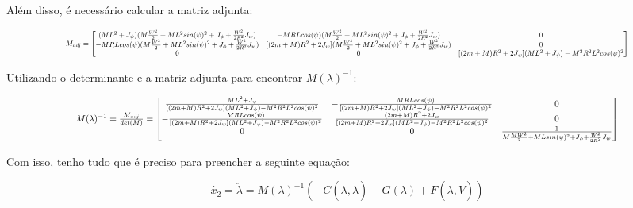 \documentclass[10pt]{article}
\begin{document}
\quad Além disso, é necessário calcular a matriz adjunta:

\begin{equation}
    \scalebox{0.65}{$
    M_{adj} =
    \begin{bmatrix}
        (ML^2 + J_\psi)(M\frac{W^2}{2}+ML^2sin(\psi)^2+J_{\phi}+\frac{W^2}{2R^2}J_w) & -MRLcos(\psi)(M\frac{W^2}{2}+ML^2sin(\psi)^2+J_{\phi}+\frac{W^2}{2R^2}J_w) & 0 \\
        -MRLcos(\psi)(M\frac{W^2}{2}+ML^2sin(\psi)^2+J_{\phi}+\frac{W^2}{2R^2}J_w) & [(2m + M)R^2 + 2J_w](M\frac{W^2}{2}+ML^2sin(\psi)^2+J_{\phi}+\frac{W^2}{2R^2}J_w) & 0 \\
        0 & 0 & [(2m + M)R^2 + 2J_w](ML^2 + J_\psi) - M^2R^2L^2cos(\psi)^2
    \end{bmatrix}
    $}
\end{equation}

\quad Utilizando o determinante e a matriz adjunta para encontrar $M(\lambda)^{-1}$:

\begin{equation}
    \scalebox{0.8}{$
    M(\lambda)^{-1} = \frac{M_{adj}}{det(M)} =
    \begin{bmatrix}
        \frac{ML^2 + J_\psi}{[(2m + M)R^2 + 2J_w](ML^2 + J_\psi) - M^2R^2L^2cos(\psi)^2} & -\frac{MRLcos(\psi)}{[(2m + M)R^2 + 2J_w](ML^2 + J_\psi) - M^2R^2L^2cos(\psi)^2} & 0 \\
        -\frac{MRLcos(\psi)}{[(2m + M)R^2 + 2J_w](ML^2 + J_\psi) - M^2R^2L^2cos(\psi)^2} & \frac{(2m + M)R^2 + 2J_w}{[(2m + M)R^2 + 2J_w](ML^2 + J_\psi) - M^2R^2L^2cos(\psi)^2} & 0 \\
        0 & 0 & \frac{1}{M\frac{MW^2}{2} + MLsin(\psi)^2 + J_\phi + \frac{W^2}{2R^2}J_w}
    \end{bmatrix}
    $}
\end{equation}

\quad Com isso, tenho tudo que é preciso para preencher a seguinte equação:

\begin{equation}
    \dot{x_2} = \ddot\lambda = M(\lambda)^{-1} \left( -C(\lambda,\dot\lambda) - G(\lambda) + F(\dot\lambda,V) \right)
\end{equation}
\end{document}
